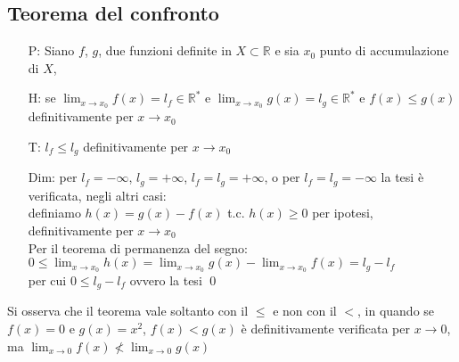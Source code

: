 \documentclass[a4paper]{article}
\begin{document}
\subsection{Teorema del confronto}
\begin{itemize}
	\item[P:] Siano \(f\), \(g\), due funzioni definite in \(X \subset \mathbb{R}\) e sia \(x_0\) punto di accumulazione di \(X\),
	\item[H:] se \(\displaystyle \lim_{x \to x_0} f(x) = l_f \in \mathbb{R}^*\) e \(\displaystyle \lim_{x \to x_0} g(x) = l_g \in \mathbb{R}^*\) e \(f(x) \leq g(x)\) definitivamente per \(x \to x_0\)
	\item[T:] \(l_f \leq l_g\) definitivamente per \(x \to x_0\)
	\item[Dim:] per \(l_f = -\infty\), \(l_g = + \infty\), \(l_f = l_g = + \infty\), o per \(l_f = l_g = - \infty\) la tesi è verificata, negli altri casi: \\
	definiamo \(h(x) = g(x) - f(x)\) t.c. \(h(x) \geq 0\) per ipotesi, definitivamente per \(x \to x_0\) \\
	Per il teorema di permanenza del segno: \(\displaystyle 0 \leq \lim_{x \to x_0} h(x) = \lim_{x \to x_0} g(x) - \lim_{x \to x_0} f(x) = l_g - l_f\) \\
	per cui \(0 \leq l_g - l_f\) ovvero la tesi \qed
\end{itemize}
Si osserva che il teorema vale soltanto con il \(\leq\) e non con il \(<\), in quando se \(f(x) = 0\) e \(g(x) = x^2\),
\(f(x) < g(x)\) è definitivamente verificata per \(x \to 0\), ma \(\displaystyle \lim_{x \to 0} f(x) \nless \lim_{x \to 0} g(x)\)

\newpage
\end{document}
